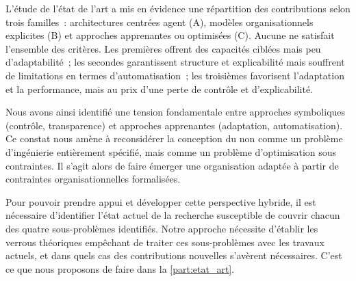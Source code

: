 L'étude de l'état de l'art a mis en évidence une répartition des contributions selon trois familles~: architectures centrées agent (A), modèles organisationnels explicites (B) et approches apprenantes ou optimisées (C). Aucune ne satisfait l'ensemble des critères. Les premières offrent des capacités ciblées mais peu d'adaptabilité~; les secondes garantissent structure et explicabilité mais souffrent de limitations en termes d'automatisation~; les troisièmes favorisent l'adaptation et la performance, mais au prix d'une perte de contrôle et d'explicabilité.

Nous avons ainsi identifié une tension fondamentale entre approches symboliques (contrôle, transparence) et approches apprenantes (adaptation, automatisation). Ce constat nous amène à reconsidérer la conception du  non comme un problème d'ingénierie entièrement spécifié, mais comme un problème d'optimisation sous contraintes. Il s'agit alors de faire émerger une organisation adaptée à partir de contraintes organisationnelles formalisées.

Pour pouvoir prendre appui et développer cette perspective hybride, il est nécessaire d'identifier l'état actuel de la recherche susceptible de couvrir chacun des quatre sous-problèmes identifiés. Notre approche nécessite d'établir les verrous théoriques empêchant de traiter ces sous-problèmes avec les travaux actuels, et dans quels cas des contributions nouvelles s'avèrent nécessaires. C'est ce que nous proposons de faire dans la \autoref{part:etat_art}.